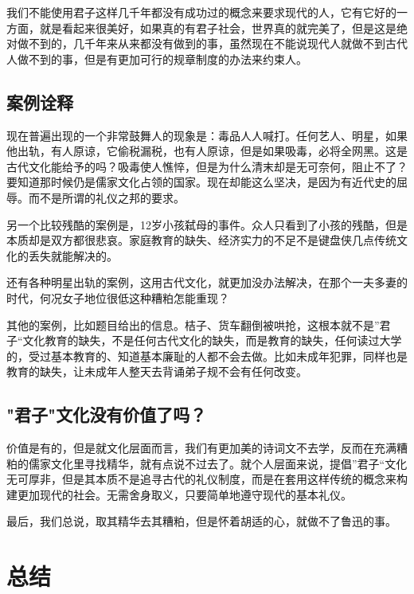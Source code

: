 \documentclass[]{article}
\begin{document}
我们不能使用君子这样几千年都没有成功过的概念来要求现代的人，它有它好的一方面，就是看起来很美好，如果真的有君子社会，世界真的就完美了，但是这是绝对做不到的，几千年来从来都没有做到的事，虽然现在不能说现代人就做不到古代人做不到的事，但是有更加可行的规章制度的办法来约束人。

\hypertarget{header-n122}{%
\subsection{案例诠释}\label{header-n122}}

现在普遍出现的一个非常鼓舞人的现象是：毒品人人喊打。任何艺人、明星，如果他出轨，有人原谅，它偷税漏税，也有人原谅，但是如果吸毒，必将全网黑。这是古代文化能给予的吗？吸毒使人憔悴，但是为什么清末却是无可奈何，阻止不了？要知道那时候仍是儒家文化占领的国家。现在却能这么坚决，是因为有近代史的屈辱。而不是所谓的礼仪之邦的要求。

另一个比较残酷的案例是，12岁小孩弑母的事件。众人只看到了小孩的残酷，但是本质却是双方都很悲哀。家庭教育的缺失、经济实力的不足不是键盘侠几点传统文化的丢失就能解决的。

还有各种明星出轨的案例，这用古代文化，就更加没办法解决，在那个一夫多妻的时代，何况女子地位很低这种糟粕怎能重现？

其他的案例，比如题目给出的信息。桔子、货车翻倒被哄抢，这根本就不是''君子``文化教育的缺失，不是任何古代文化的缺失，而是教育的缺失，任何读过大学的，受过基本教育的、知道基本廉耻的人都不会去做。比如未成年犯罪，同样也是教育的缺失，让未成年人整天去背诵弟子规不会有任何改变。

\hypertarget{header-n131}{%
\subsection{"君子"文化没有价值了吗？}\label{header-n131}}

价值是有的，但是就文化层面而言，我们有更加美的诗词文不去学，反而在充满糟粕的儒家文化里寻找精华，就有点说不过去了。就个人层面来说，提倡''君子``文化无可厚非，但是其本质不是追寻古代的礼仪制度，而是在套用这样传统的概念来构建更加现代的社会。无需舍身取义，只要简单地遵守现代的基本礼仪。

最后，我们总说，取其精华去其糟粕，但是怀着胡适的心，就做不了鲁迅的事。

\hypertarget{header-n136}{%
\section{总结}\label{header-n136}}
\end{document}
